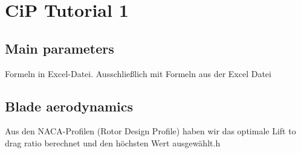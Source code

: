 \documentclass[10pt]{article}
\begin{document}
\lstset{
	language=C,
	basicstyle=\footnotesize,
	frame=tb,
	xleftmargin=.2\textwidth,
	xrightmargin=.2\textwidth
}
\onehalfspacing

\tableofcontents
\newpage
\section{CiP Tutorial 1}
\subsection{Main parameters}
Formeln in Excel-Datei. Ausschließlich mit Formeln aus der Excel Datei
\subsection{Blade aerodynamics}
Aus den NACA-Profilen (Rotor Design Profile) haben wir das optimale Lift to drag ratio berechnet und den höchsten Wert ausgewählt.h
\end{document}
